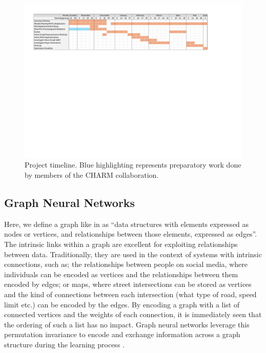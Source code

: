 \begin{figure}[h]
    \centering
    \includegraphics[width=1\linewidth]{Images/Part3ProjectPlanPDF.pdf}
    \caption{\centering Project timeline. Blue highlighting represents preparatory work done by members of the CHARM collaboration.}
    \label{fig:plan}
\end{figure}

\subsection{Graph Neural Networks}
Here, we define a graph like in \cite{broadwater_graph_2025} as “data structures with elements expressed as nodes or vertices, and relationships between those elements, expressed as edges”. The intrinsic links within a graph are excellent for exploiting relationships between data. Traditionally, they are used in the context of systems with intrinsic connections, such as; the relationships between people on social media, where individuals can be encoded as vertices and the relationships between them encoded by edges; or maps, where street intersections can be stored as vertices and the kind of connections between each intersection (what type of road, speed limit etc.) can be encoded by the edges. By encoding a graph with a list of connected vertices and the weights of each connection, it is immediately seen that the ordering of such a list has no impact. Graph neural networks leverage this permutation invariance to encode and exchange information across a graph structure during the learning process \cite{broadwater_graph_2025}. \\




